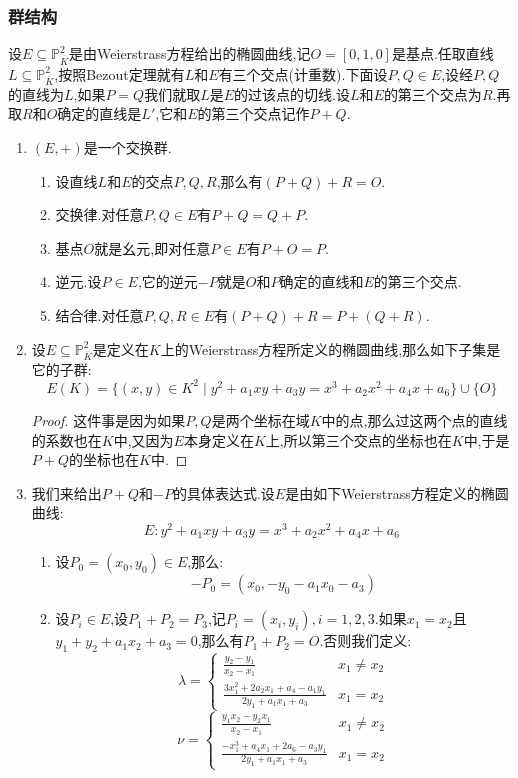 \subsubsection{群结构}

设$E\subseteq\mathbb{P}^2_{\overline{K}}$是由Weierstrass方程给出的椭圆曲线,记$O=[0,1,0]$是基点.任取直线$L\subseteq\mathbb{P}^2_{\overline{K}}$,按照Bezout定理就有$L$和$E$有三个交点(计重数).下面设$P,Q\in E$,设经$P,Q$的直线为$L$,如果$P=Q$我们就取$L$是$E$的过该点的切线.设$L$和$E$的第三个交点为$R$.再取$R$和$O$确定的直线是$L'$,它和$E$的第三个交点记作$P+Q$.
\begin{enumerate}
	\item $(E,+)$是一个交换群.
	\begin{enumerate}
		\item 设直线$L$和$E$的交点$P,Q,R$,那么有$(P+Q)+R=O$.
		\item 交换律.对任意$P,Q\in E$有$P+Q=Q+P$.
		\item 基点$O$就是幺元,即对任意$P\in E$有$P+O=P$.
		\item 逆元.设$P\in E$,它的逆元$-P$就是$O$和$P$确定的直线和$E$的第三个交点.
		\item 结合律.对任意$P,Q,R\in E$有$(P+Q)+R=P+(Q+R)$.
	\end{enumerate}
	\item 设$E\subseteq\mathbb{P}^2_{\overline{K}}$是定义在$K$上的Weierstrass方程所定义的椭圆曲线,那么如下子集是它的子群:
	$$E(K)=\{(x,y)\in K^2\mid y^2+a_1xy+a_3y=x^3+a_2x^2+a_4x+a_6\}\cup\{O\}$$
	\begin{proof}
		
		这件事是因为如果$P,Q$是两个坐标在域$K$中的点,那么过这两个点的直线的系数也在$K$中,又因为$E$本身定义在$K$上,所以第三个交点的坐标也在$K$中,于是$P+Q$的坐标也在$K$中.
	\end{proof}
	\item 我们来给出$P+Q$和$-P$的具体表达式.设$E$是由如下Weierstrass方程定义的椭圆曲线:
	$$E:y^2+a_1xy+a_3y=x^3+a_2x^2+a_4x+a_6$$
	\begin{enumerate}
		\item 设$P_0=(x_0,y_0)\in E$,那么:
		$$-P_0=(x_0,-y_0-a_1x_0-a_3)$$
		\item 设$P_i\in E$,设$P_1+P_2=P_3$,记$P_i=(x_i,y_i),i=1,2,3$.如果$x_1=x_2$且$y_1+y_2+a_1x_2+a_3=0$,那么有$P_1+P_2=O$.否则我们定义:
		$$\lambda=\left\{\begin{array}{cc}\frac{y_2-y_1}{x_2-x_1}&x_1\not=x_2\\\frac{3x_1^2+2a_2x_1+a_4-a_1y_1}{2y_1+a_1x_1+a_3}&x_1=x_2\end{array}\right.$$
		$$\nu=\left\{\begin{array}{cc}\frac{y_1x_2-y_2x_1}{x_2-x_1}&x_1\not=x_2\\\frac{-x_1^3+a_4x_1+2a_6-a_3y_1}{2y_1+a_1x_1+a_3}&x_1=x_2\end{array}\right.$$
		

\end{enumerate}
\end{enumerate}
